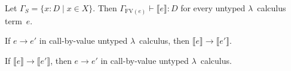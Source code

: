 \documentclass{lecturenotes}
\newcommand{\FV}{\text{FV}}
\begin{document}
\begin{thm}
  Let $\Gamma_S = \{x : D \mid x \in X\}$.
  Then $\Gamma_{\FV(e)} \vdash \llbracket e \rrbracket  : D$ for every untyped $\lambda$~calculus term~$e$.
\end{thm}

\begin{thm}
  If $e \to e'$ in call-by-value untyped $\lambda$~calculus, then $\llbracket e \rrbracket \to \llbracket e' \rrbracket$.
\end{thm}

\begin{thm}
  If $\llbracket e \rrbracket \to \llbracket e' \rrbracket$, then $e \to e'$ in call-by-value untyped $\lambda$~calculus.
\end{thm}
\end{document}
